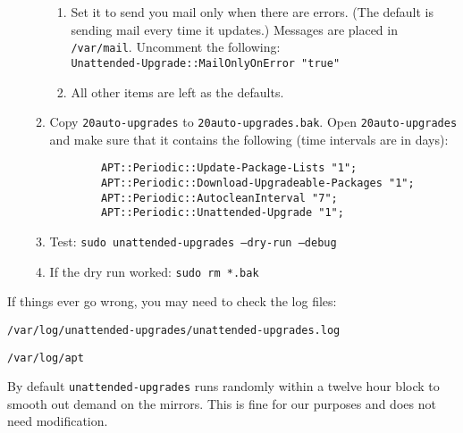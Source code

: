 \begin{itemize}
\begin{enumerate}
\begin{enumerate}
		\item Set it to send you mail only when there are errors. (The default is sending mail every time it updates.) Messages are placed in \texttt{/var/mail}. Uncomment the following: \\
		\texttt{Unattended-Upgrade::MailOnlyOnError "true"}
			
		\item All other items are left as the defaults.
		\end{enumerate}

	\item Copy \texttt{20auto-upgrades} to \texttt{20auto-upgrades.bak}. Open \texttt{20auto-upgrades} and make sure that it contains the following (time intervals are in days):
		\begin{verbatim}
		APT::Periodic::Update-Package-Lists "1";
		APT::Periodic::Download-Upgradeable-Packages "1";
		APT::Periodic::AutocleanInterval "7";
		APT::Periodic::Unattended-Upgrade "1";
		\end{verbatim}

	\item Test: \texttt{sudo unattended-upgrades --dry-run --debug}

	\item If the dry run worked: \texttt{sudo rm *.bak}
	\end{enumerate}

\end{itemize}

If things ever go wrong, you may need to check the log files:

	\texttt{/var/log/unattended-upgrades/unattended-upgrades.log}
	
	\texttt{/var/log/apt}

By default \texttt{unattended-upgrades} runs randomly within a twelve hour block to smooth out demand on the mirrors. This is fine for our purposes and does not need modification.

%
%	
%
%
%
%

